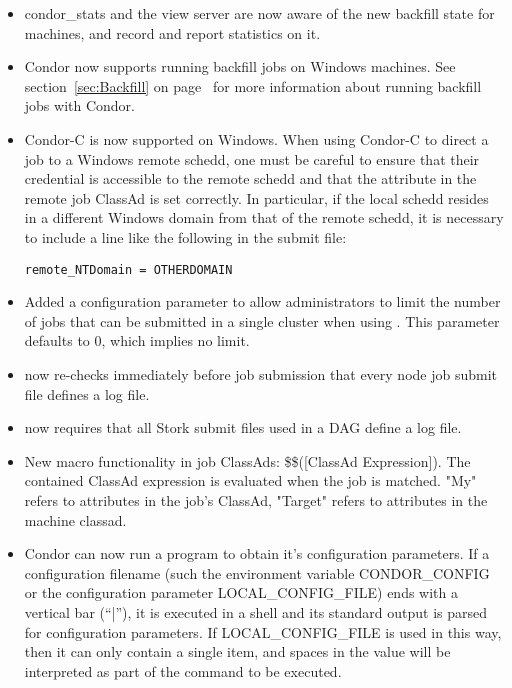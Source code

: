 \begin{itemize}

\item condor\_stats and the view server are now aware of the new backfill
state for machines, and record and report statistics on it.

\item Condor now supports running backfill jobs on Windows machines.
  See section~\ref{sec:Backfill} on page~\pageref{sec:Backfill} for
  more information about running backfill jobs with Condor.

\item Condor-C is now supported on Windows. When using Condor-C to
direct a job to a Windows remote schedd, one must be careful to ensure
that their credential is accessible to the remote schedd and that the
 attribute in the remote job ClassAd is set
correctly. In particular, if the local schedd resides in a different
Windows domain from that of the remote schedd, it is necessary to
include a line like the following in the submit file:
\begin{verbatim}
remote_NTDomain = OTHERDOMAIN
\end{verbatim}

\item Added a  configuration
parameter to allow administrators to limit the number of jobs that can
be submitted in a single cluster when using . This
parameter defaults to 0, which implies no limit.

\item {} now re-checks immediately before job submission
that every node job submit file defines a log file.

\item {} now requires that all Stork submit files used
in a DAG define a log file.

\item New macro functionality in job ClassAds: \$\$([ClassAd Expression]).  The contained ClassAd expression is evaluated when the job is matched.  "My" refers to attributes in the job's ClassAd, "Target" refers to attributes in the machine classad.

\item Condor can now run a program to obtain it's configuration
parameters.
If a configuration filename (such the environment variable CONDOR\_CONFIG
or the configuration parameter LOCAL\_CONFIG\_FILE) ends with a vertical
bar (``|''), it is executed in a shell and its standard output is parsed
for configuration parameters. If LOCAL\_CONFIG\_FILE is used in this way,
then it can only contain a single item, and spaces in the value will be
interpreted as part of the command to be executed.


\end{itemize}

